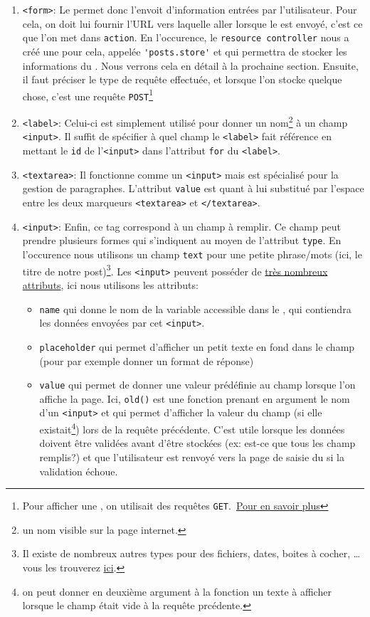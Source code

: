 \begin{enumerate}
    \item \verb|<form>|: Le \form{} permet donc l'envoit d'information entrées par l'utilisateur. Pour cela, on doit lui fournir l'URL vers laquelle aller lorsque le \form{} est envoyé, c'est ce que l'on met dans \verb|action|. En l'occurence, le \texttt{resource controller} nous a créé une \route{} pour cela, appelée \verb|'posts.store'| et qui permettra de stocker les informations du \form{}. Nous verrons cela en détail à la prochaine section. Ensuite, il faut préciser le type de requête effectuée, et lorsque l'on stocke quelque chose, c'est une requête \verb|POST|\footnote{Pour afficher une \view, on utilisait des requêtes \verb|GET|.\ \href{https://developer.mozilla.org/fr/docs/Web/HTTP/Methods}{Pour en savoir plus}}
    \item \verb|<label>|: Celui-ci est simplement utilisé pour donner un nom\footnote{un nom visible sur la page internet.} à un champ \verb|<input>|. Il suffit de spécifier à quel champ le \verb|<label>| fait référence en mettant le \verb|id| de l'\verb|<input>| dans l'attribut \verb|for| du \verb|<label>|.
    \item \verb|<textarea>|: Il fonctionne comme un \verb|<input>| mais est spécialisé pour la gestion de paragraphes. L'attribut \verb|value| est quant à lui substitué par l'espace entre les deux marqueurs \verb|<textarea>| et \verb|</textarea>|.
    \item \verb|<input>|: Enfin, ce tag correspond à un champ à remplir. Ce champ peut prendre plusieurs formes qui s'indiquent au moyen de l'attribut \verb|type|. En l'occurence nous utilisons un champ \verb|text| pour une petite phrase/mots (ici, le titre de notre post)\footnote{Il existe de nombreux autres types pour des fichiers, dates, boites à cocher, \ldots vous les trouverez \href{https://developer.mozilla.org/en-US/docs/Web/HTML/Element/input#input_types}{ici}.}. Les \verb|<input>| peuvent posséder de \href{https://developer.mozilla.org/en-US/docs/Web/HTML/Element/input#attributes}{très nombreux attributs}, ici nous utilisons les attributs:
    \begin{itemize}
        \item \verb|name| qui donne le nom de la variable accessible dans le \controller{}, qui contiendra les données envoyées par cet \verb|<input>|.
        \item \verb|placeholder| qui permet d'afficher un petit texte en fond dans le champ (pour par exemple donner un format de réponse)
        \item \verb|value| qui permet de donner une valeur prédéfinie au champ lorsque l'on affiche la page. Ici, \verb|old()| est une fonction prenant en argument le nom d'un \verb|<input>| et qui permet d'afficher la valeur du champ (si elle existait\footnote{on peut donner en deuxième argument à la fonction un texte à afficher lorsque le champ était vide à la requête prcédente.}) lors de la requête précédente. C'est utile lorsque les données doivent être validées avant d'être stockées (ex: est-ce que tous les champ remplis?) et que l'utilisateur est renvoyé vers la page de saisie du \form{} si la validation échoue.
    \end{itemize}
\end{enumerate}

